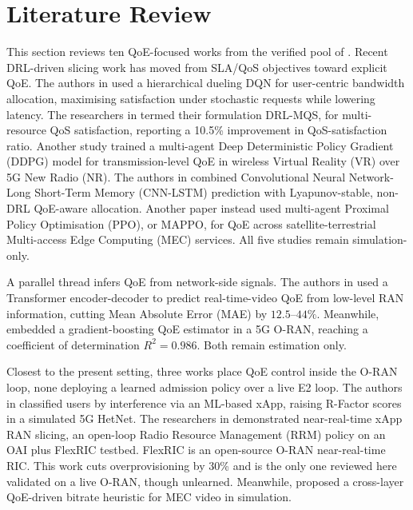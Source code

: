 \documentclass[10pt]{article}
\begin{document}
\section{Literature Review}
This section reviews ten QoE-focused works from the verified pool of
\cite{survey-paper3}. Recent DRL-driven slicing work has moved from SLA/QoS objectives
toward explicit QoE. The authors in \cite{wang2025usercentric} used a
hierarchical dueling DQN for user-centric bandwidth allocation,
maximising satisfaction under stochastic requests while lowering
latency. The researchers in \cite{lai2024multiresource} termed their
formulation DRL-MQS, for multi-resource QoS satisfaction, reporting a
10.5\% improvement in QoS-satisfaction ratio. Another study
\cite{kougioumtzidis2025drlvr} trained a multi-agent Deep
Deterministic Policy Gradient (DDPG) model for transmission-level QoE
in wireless Virtual Reality (VR) over 5G New Radio (NR). The authors
in \cite{chen2026qoeslicing} combined Convolutional Neural
Network-Long Short-Term Memory (CNN-LSTM) prediction with
Lyapunov-stable, non-DRL QoE-aware allocation. Another paper
\cite{yin2026qoestin} instead used multi-agent Proximal Policy
Optimisation (PPO), or MAPPO, for QoE across satellite-terrestrial
Multi-access Edge Computing (MEC) services. All five studies remain
simulation-only.

A parallel thread infers QoE from network-side signals. The authors
in \cite{sun2025qoeric} used a Transformer encoder-decoder to predict
real-time-video QoE from low-level RAN information, cutting Mean
Absolute Error (MAE) by $12.5$--$44\%$. Meanwhile, \cite{gonzalez2025qoeoran}
embedded a gradient-boosting QoE estimator in a 5G O-RAN, reaching a
coefficient of determination $R^2=0.986$. Both remain estimation only.

Closest to the present setting, three works place QoE control inside
the O-RAN loop, none deploying a learned admission policy over
a live E2 loop. The authors in \cite{anand2024qoexapp} classified
users by interference via an ML-based xApp, raising R-Factor scores in a simulated 5G HetNet.
The researchers in \cite{casparsen2025vroran} demonstrated
near-real-time xApp RAN slicing, an open-loop Radio Resource
Management (RRM) policy on an OAI plus FlexRIC testbed. FlexRIC is an
open-source O-RAN near-real-time RIC. This work cuts overprovisioning
by 30\% and is the only one reviewed here validated on a live O-RAN,
though unlearned. Meanwhile, \cite{yeznabad2024clqdba} proposed a
cross-layer QoE-driven bitrate heuristic for MEC video in simulation.
\end{document}
